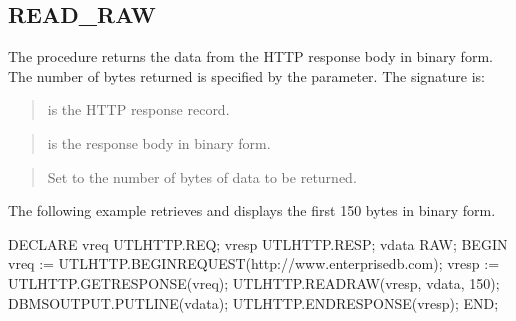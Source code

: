 \documentclass[letterpaper,10pt,english,openany,oneside]{sphinxmanual}
\begin{document}
\subsection{READ\_RAW}
\label{\detokenize{utl_http:read-raw}}
The  procedure returns the data from the HTTP response body in
binary form. The number of bytes returned is specified by the 
parameter. The signature is:
\begin{quote}

\end{quote}


\begin{quote}

 is the HTTP response record.
\end{quote}

\begin{quote}

 is the response body in binary form.
\end{quote}

\begin{quote}

Set  to the number of bytes of data to be returned.
\end{quote}


The following example retrieves and displays the first 150 bytes in
binary form.

%
\begin{sphinxVerbatim}[commandchars=\\\{\}]
DECLARE
    v\PYGZus{}req           UTL\PYGZus{}HTTP.REQ;
    v\PYGZus{}resp          UTL\PYGZus{}HTTP.RESP;
    v\PYGZus{}data          RAW;
BEGIN
    v\PYGZus{}req := UTL\PYGZus{}HTTP.BEGIN\PYGZus{}REQUEST(\PYGZsq{}http://www.enterprisedb.com\PYGZsq{});
    v\PYGZus{}resp := UTL\PYGZus{}HTTP.GET\PYGZus{}RESPONSE(v\PYGZus{}req);
    UTL\PYGZus{}HTTP.READ\PYGZus{}RAW(v\PYGZus{}resp, v\PYGZus{}data, 150);
    DBMS\PYGZus{}OUTPUT.PUT\PYGZus{}LINE(v\PYGZus{}data);
    UTL\PYGZus{}HTTP.END\PYGZus{}RESPONSE(v\PYGZus{}resp);
END;
\end{sphinxVerbatim}
\end{document}
